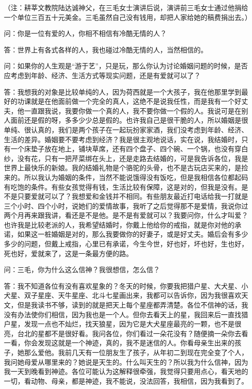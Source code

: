 \par （注：耕莘文教院陆达诚神父，在三毛女士演讲后说，演讲前三毛女士通过他捐给一个单位三百五十元美金。三毛虽然自己没有钱用，却把人家给她的稿费捐出去。）
\par 问：你是一位有爱的人，你相不相信有冷酷无情的人？
\par 答：世界上有各式各样的人，我也碰过冷酷无情的人，当然相信的。
\par 问：如果你的人生观是“游于艺”，只是玩，那么你认为讨论婚姻问题的时候，是否应考虑到年龄、经济、生活方式等现实问题，还是有爱就可以了？
\par 答：我想我的对象是比较单纯的人，因为荷西就是一个大孩子，我在他那里学到最好的功课就是在他面前做一个完全的真人，这绝不是说我任性，而是我有一个好丈夫，他一直跟我说，我要你做一个真的人，我不要你做一个假的人。我说可是在别人面前还是假的呀，多多少少总是假的。也许我自己是很干脆的人，所以婚姻是很单纯、很认真的，我们是两个孩子在一起玩扮家家酒，我们没考虑到年龄、经济、生活的差异。婚姻要不要考虑到经济？我是很主观地说话，实在说，我结婚时，只有一个床垫子放在地上，铺块草席，还有四个盘子、四个碗、一个锅，也没有穿白纱，没有花，只有一把芹菜绑在头上，还是走路去结婚的，可是我告诉各位，我是世界上最快乐的新娘。我的结婚礼物是个骆驼的头骨，也不是古玩店买来的，是捡来的。所以我认为婚姻的条件，当然不能说饿得没有饭吃，但是我相信各位都起码有吃饱的条件。有些女孩觉得有钱，生活比较有保障，这是对的，但我是没有。是不是只要爱就可以了？我想爱和金钱并不相同。有些朋友最近打电话给我一打就是三个小时、四个小时，说她们的爱情故事，我听了之后觉得那不是爱情，我说你过两个月再来跟我讲，看还是不是他。是不是有爱就可以？我要问你，什么才叫爱？也许我是比较老派的人，我希望结婚时，你戴上他给你的戒指，就是你对他的承诺，如果这一桩婚姻是对的，那么我要做你的好妻子，或是好丈夫。婚后会有多少多少的问题，但戴上戒指，心里已有承诺，今生今世，好也好，坏也好，生也好，死也好，爱就来了，这是一条最方便的路。
\par 问：三毛，你为什么这么信神？我很想信，怎么信？
\par 答：我不知道各位有没有喜欢星象的？冬天的时候，你要我把猎户星、大犬星、小犬星、双子星座、天牛星座、北斗七星画出来，我都可以告诉你，因为我很喜欢天文，但是我读书不够，读到的就是把天上每个星座都弄清楚。各位不信神的话，我没有办法使你们相信，因为我也是一个人。但你去看天上的星，我回来后一直找猎户星，发现一点也不灿烂，找天狼星，因为它是大犬星座最亮的一颗，也不是很亮，台北的星都不是很好看。我问各位，你们看过一朵花没有？随便摘一朵你去看一看，你会发现这就是一个神迹，真的，我不是迷信的人。你看母亲生出来的孩子，她那么爱他。我前几天有一位朋友生了孩子，从年初二到现在完全变了个人，我问她母爱从哪里来的？她说是天生的。什么叫天生的？所以我为什么信神，因为我一天到晚看到神迹。各位可能认为这解释很牵强，我觉得只要用点心，看天地的一切，看动物、母亲，都是神迹，我不能说，没法回答，我相信，因为我看到了。


